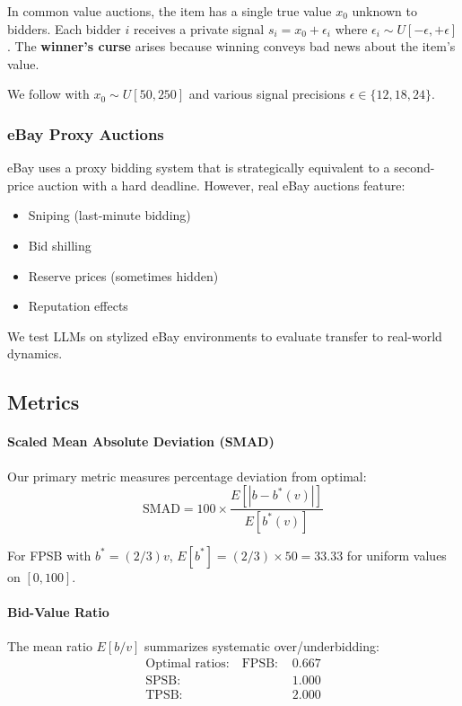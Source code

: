 \documentclass[12pt]{article}
\newcommand{\smad}{\text{SMAD}}
\begin{document}
In common value auctions, the item has a single true value $x_0$ unknown to bidders. Each bidder $i$ receives a private signal $s_i = x_0 + \epsilon_i$ where $\epsilon_i \sim U[-\epsilon, +\epsilon]$. The \textbf{winner's curse} arises because winning conveys bad news about the item's value.

We follow \citet{kagel1986winners} with $x_0 \sim U[50, 250]$ and various signal precisions $\epsilon \in \{12, 18, 24\}$.

\subsubsection{eBay Proxy Auctions}

eBay uses a proxy bidding system that is strategically equivalent to a second-price auction with a hard deadline. However, real eBay auctions feature:
\begin{itemize}
    \item Sniping (last-minute bidding)
    \item Bid shilling
    \item Reserve prices (sometimes hidden)
    \item Reputation effects
\end{itemize}

We test LLMs on stylized eBay environments to evaluate transfer to real-world dynamics.

\subsection{Metrics}

\paragraph{Scaled Mean Absolute Deviation (SMAD)} Our primary metric measures percentage deviation from optimal:
\begin{equation}
    \smad = 100 \times \frac{E[|b - b^*(v)|]}{E[b^*(v)]}
\end{equation}

For FPSB with $b^* = (2/3)v$, $E[b^*] = (2/3) \times 50 = 33.33$ for uniform values on $[0,100]$.

\paragraph{Bid-Value Ratio} The mean ratio $E[b/v]$ summarizes systematic over/underbidding:
\begin{align}
    \text{Optimal ratios:} \quad
    \text{FPSB: } & 0.667 \\
    \text{SPSB: } & 1.000 \\
    \text{TPSB: } & 2.000
\end{align}
\end{document}
